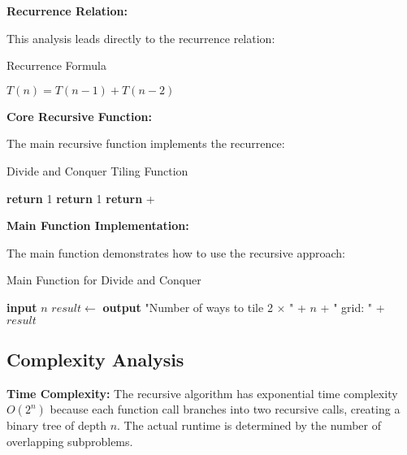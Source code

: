 \documentclass[conference]{IEEEtran}
\begin{document}
\textbf{Recurrence Relation:}

This analysis leads directly to the recurrence relation:

\begin{algorithm}[htbp]
\caption{Recurrence Formula}
\begin{algorithmic}[1]
\State $T(n) = T(n-1) + T(n-2)$
\State {}
\end{algorithmic}
\end{algorithm}

\textbf{Core Recursive Function:}

The main recursive function implements the recurrence:

\begin{algorithm}[htbp]
\caption{Divide and Conquer Tiling Function}
\begin{algorithmic}[1]
        \State \textbf{return} 1
    \EndIf
        \State \textbf{return} 1
    \EndIf
    \State \textbf{return}  + 
\EndProcedure
\end{algorithmic}
\end{algorithm}

\textbf{Main Function Implementation:}

The main function demonstrates how to use the recursive approach:

\begin{algorithm}[htbp]
\caption{Main Function for Divide and Conquer}
\begin{algorithmic}[1]
    \State \textbf{input} $n$ 
    \State $result \gets$ 
    \State \textbf{output} "Number of ways to tile 2 × " + $n$ + " grid: " + $result$
\EndProcedure
\end{algorithmic}
\end{algorithm}

\subsection{Complexity Analysis}

\textbf{Time Complexity:} The recursive algorithm has exponential time complexity $O(2^n)$ because each function call branches into two recursive calls, creating a binary tree of depth $n$. The actual runtime is determined by the number of overlapping subproblems.
\end{document}
